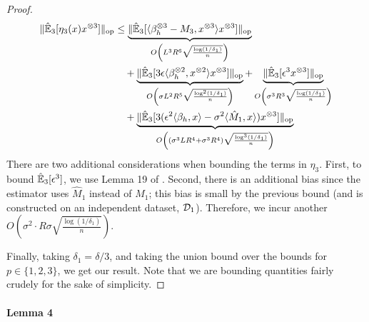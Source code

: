 \begin{proof}
{\begin{align*}
  \| \hat{\operatorname{\mathbb{E}}}_3[ \eta_3(x) x^{\otimes 3} ] \|_{\text{op}} &\le 
            \underbrace{ \|\hat{\operatorname{\mathbb{E}}}_3[\langle \beta_h^{\otimes 3} - M_3, x^{\otimes 3} \rangle                      x^{\otimes 3}]\|_{\text{\rm op}} }_{O\left( L^3 R^6        \sqrt{\frac{\log  (1/\delta_1)}{n}} \right) } \\
   &\quad + \underbrace{ \|\hat{\operatorname{\mathbb{E}}}_3[3 \epsilon \langle \beta_h^{\otimes 2}, x^{\otimes 2} \rangle                 x^{\otimes 3}]\|_{\text{\rm op}} }_{O\left( \sigma L^2 R^5 \sqrt{\frac{\log^2(1/\delta_1)}{n}} \right) } 
          + \underbrace{ \|\hat{\operatorname{\mathbb{E}}}_3[\epsilon^3                                  x^{\otimes 3}]\|_{\text{\rm op}} }_{O\left( \sigma^3 R^3   \sqrt{\frac{\log  (1/\delta_1)}{n}} \right) } \\
   &\quad + \underbrace{ \|\hat{\operatorname{\mathbb{E}}}_3[3(\epsilon^2 \langle \beta_h, x \rangle -\sigma^2 \langle \hat M_1, x \rangle) x^{\otimes 3}]\|_{\text{\rm op}} }_{O\left( (\sigma^3 L R^4 + \sigma^3 R^4) \sqrt{\frac{\log^3(1/\delta_1)}{n}} \right) } \\
\end{align*}
}
There are two additional considerations when bounding the terms in $\eta_3$.
First, to bound $\hat{\operatorname{\mathbb{E}}}_3[\epsilon^3]$, we use Lemma 19 of \cite{hsu13spherical}.
Second, there is an additional bias since the estimator uses $\hat M_1$ instead of $M_1$; this bias is small by the previous bound (and is constructed on an independent dataset, $\mathcal{D}_1$).
Therefore, we incur another $O(\sigma^2 \cdot R \sigma \sqrt{\frac{\log(1/\delta_1)}{n}})$.

Finally, taking $\delta_1 = \delta/3$, and taking the union bound over the bounds for $p \in \{1,2,3\}$,
we get our result.
Note that we are bounding quantities fairly crudely for the sake of simplicity.
\end{proof}

\paragraph{Lemma 4}

